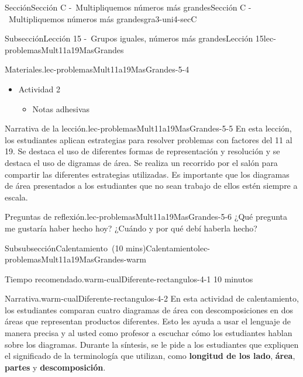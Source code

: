 \documentclass[oneside,10pt,]{article}
\newcommand{\terminology}[1]{\textbf{#1}}
\begin{document}
\begin{sectionptx}{Sección}{Sección C -~Multipliquemos números más grandes}{}{Sección C -~Multipliquemos números más grandes}{}{}{gra3-uni4-secC}
\begin{subsectionptx}{Subsección}{Lección 15 -~Grupos iguales, números más grandes}{}{Lección 15}{}{}{lec-problemasMult11a19MasGrandes}
\begin{introduction}{}
\begin{paragraphs}{Materiales.}{lec-problemasMult11a19MasGrandes-5-4}
\begin{itemize}[label=\textbullet]
\begin{itemize}[label=$\circ$]
\end{itemize}
\item{}Actividad 2%
%
\begin{itemize}[label=$\circ$]
\item{}Notas adhesivas%
\end{itemize}
\end{itemize}
\end{paragraphs}%
\begin{paragraphs}{Narrativa de la lección.}{lec-problemasMult11a19MasGrandes-5-5}%
En esta lección, los estudiantes aplican estrategias para resolver problemas con factores del 11 al 19. Se destaca el uso de diferentes formas de representación y resolución y se destaca el uso de digramas de área. Se realiza un recorrido por el salón para compartir las diferentes estrategias utilizadas. Es importante que los diagramas de área presentados a los estudiantes que no sean trabajo de ellos estén siempre a escala.%
\end{paragraphs}%
\begin{paragraphs}{Preguntas de reflexión.}{lec-problemasMult11a19MasGrandes-5-6}%
¿Qué pregunta me gustaría haber hecho hoy? ¿Cuándo y por qué debí haberla hecho?%
\end{paragraphs}%
\end{introduction}%
%
%
\typeout{************************************************}
\typeout{************************************************}
%
\begin{subsubsectionptx}{Subsubsección}{Calentamiento~(10 mins)}{}{Calentamiento}{}{}{lec-problemasMult11a19MasGrandes-warm}
\par
\begin{paragraphs}{Tiempo recomendado.}{warm-cualDiferente-rectangulos-4-1}%
10 minutos%
\end{paragraphs}%
\begin{paragraphs}{Narrativa.}{warm-cualDiferente-rectangulos-4-2}%
En esta actividad de calentamiento, los estudiantes comparan cuatro diagramas de área con descomposiciones en dos áreas que representan productos diferentes. Esto les ayuda a usar el lenguaje de manera precisa y al usted como profesor a escuchar cómo los estudiantes hablan sobre los diagramas. Durante la síntesis, se le pide a los estudiantes que expliquen el significado de la terminología que utilizan, como \terminology{longitud de los lado}, \terminology{área}, \terminology{partes} y \terminology{descomposición}.%
\end{paragraphs}%

\end{subsubsectionptx}
\end{subsectionptx}
\end{sectionptx}
\end{document}
